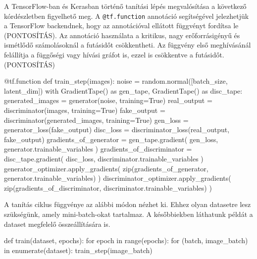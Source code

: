 A TensorFlow-ban és Kerasban történő tanítási lépés megvalósítása a következő kórdészletben figyelhető meg. A \texttt{@tf.function} annotáció segítségével jelezhetjük a TensorFlow backendnek, hogy az annotációval ellátott függvényt fordítsa le (PONTOSÍTÁS). Az annotáció használata a kritikus, nagy erőforrásigényű és ismétlődő számolásoknál a futásidőt csökkentheti. Az függvény első meghívásánál felállítja a függőségi vagy hívási gráfot is, ezzel is csökkentve a futásidőt. (PONTOSÍTÁS)
\begin{python}
@tf.function
def train_step(images):
    noise = random.normal([batch_size, latent_dim])
    with GradientTape() as gen_tape, GradientTape() as disc_tape:
        generated_images = generator(noise, training=True)
        real_output = discriminator(images, training=True)
        fake_output = discriminator(generated_images, training=True)
        gen_loss = generator_loss(fake_output)
        disc_loss = discriminator_loss(real_output, fake_output)
    gradients_of_generator = gen_tape.gradient(
        gen_loss, generator.trainable_variables
    )
    gradients_of_discriminator = disc_tape.gradient(
        disc_loss, discriminator.trainable_variables
    )
    generator_optimizer.apply_gradients(
        zip(gradients_of_generator,
        generator.trainable_variables)
    )
    discriminator_optimizer.apply_gradients(
        zip(gradients_of_discriminator,
        discriminator.trainable_variables)
    )
\end{python}

A tanítás ciklus függvénye az alábbi módon nézhet ki. Ehhez olyan datasetre lesz szükségünk, amely mini-batch-okat tartalmaz. A későbbiekben láthatunk példát a dataset megfelelő összeállítására is.
\begin{python}
def train(dataset, epochs):
    for epoch in range(epochs):
        for (batch, image_batch) in enumerate(dataset):
            train_step(image_batch)
\end{python}


